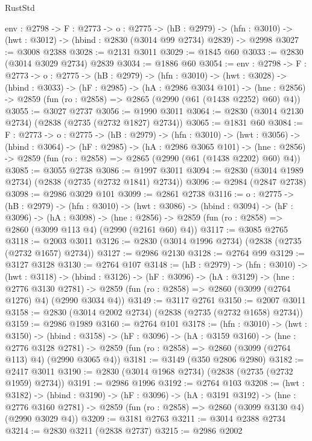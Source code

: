 \begin{lexlean}{RustStd}
\begin{coremodule}
  {env : @2798} ->
  {F : @2773} ->
  {o : @2775} ->
  (hB : @2979) -> (hfn : @3010) -> (hwt : @3012) -> (hbind : @2830 (@3014 @99 @2734) @2839) -> @2998
@3027 := @3008 @2388
@3028 := @2131 @3011
@3029 := @1845 @60
@3033 := @2830 (@3014 @3029 @2734) @2839
@3034 := @1886 @60
@3054 := {env : @2798} ->
  {F : @2773} ->
  {o : @2775} ->
  (hB : @2979) ->
  (hfn : @3010) ->
  (hwt : @3028) ->
  (hbind : @3033) ->
  (hF : @2985) ->
  (hA : @2986 @3034 @101) ->
  (hne : @2856) -> @2859 (fun (ro : @2858) => @2865 (@2990 (@61 (@1438 @2252) @60) @4))
@3055 := @3027 @2737
@3056 := @1990 @3011
@3064 := @2830 (@3014 @2130 @2734) (@2838 (@2735 (@2732 @1827) @2734))
@3065 := @1831 @60
@3084 := {F : @2773} ->
  {o : @2775} ->
  (hB : @2979) ->
  (hfn : @3010) ->
  (hwt : @3056) ->
  (hbind : @3064) ->
  (hF : @2985) ->
  (hA : @2986 @3065 @101) ->
  (hne : @2856) -> @2859 (fun (ro : @2858) => @2865 (@2990 (@61 (@1438 @2202) @60) @4))
@3085 := @3055 @2738
@3086 := @1997 @3011
@3094 := @2830 (@3014 @1989 @2734) (@2838 (@2735 (@2732 @1841) @2734))
@3096 := @2984 (@2847 @2738)
@3098 := @2986 @3029 @101
@3099 := @2861 @2738
@3116 := {o : @2775} ->
  (hB : @2979) ->
  (hfn : @3010) ->
  (hwt : @3086) ->
  (hbind : @3094) ->
  (hF : @3096) ->
  (hA : @3098) ->
  (hne : @2856) -> @2859 (fun (ro : @2858) => @2860 (@3099 @113 @4) (@2990 (@2161 @60) @4))
@3117 := @3085 @2765
@3118 := @2003 @3011
@3126 := @2830 (@3014 @1996 @2734) (@2838 (@2735 (@2732 @1657) @2734))
@3127 := @2986 @2130
@3128 := @2764 @99
@3129 := @3127 @3128
@3130 := @2764 @107
@3148 := (hB : @2979) ->
  (hfn : @3010) ->
  (hwt : @3118) ->
  (hbind : @3126) ->
  (hF : @3096) ->
  (hA : @3129) ->
  (hne : @2776 @3130 @2781) ->
  @2859 (fun (ro : @2858) => @2860 (@3099 (@2764 @1276) @4) (@2990 @3034 @4))
@3149 := @3117 @2761
@3150 := @2007 @3011
@3158 := @2830 (@3014 @2002 @2734) (@2838 (@2735 (@2732 @1658) @2734))
@3159 := @2986 @1989
@3160 := @2764 @101
@3178 := (hfn : @3010) ->
  (hwt : @3150) ->
  (hbind : @3158) ->
  (hF : @3096) ->
  (hA : @3159 @3160) ->
  (hne : @2776 @3128 @2781) ->
  @2859 (fun (ro : @2858) => @2860 (@3099 (@2764 @113) @4) (@2990 @3065 @4))
@3181 := @3149 (@350 @2806 @2980)
@3182 := @2417 @3011
@3190 := @2830 (@3014 @1968 @2734) (@2838 (@2735 (@2732 @1959) @2734))
@3191 := @2986 @1996
@3192 := @2764 @103
@3208 := (hwt : @3182) ->
  (hbind : @3190) ->
  (hF : @3096) ->
  (hA : @3191 @3192) ->
  (hne : @2776 @3160 @2781) -> @2859 (fun (ro : @2858) => @2860 (@3099 @3130 @4) (@2990 @3029 @4))
@3209 := @3181 @2763
@3211 := @3014 @2388 @2734
@3214 := @2830 @3211 (@2838 @2737)
@3215 := @2986 @2002

\end{coremodule}
\end{lexlean}
